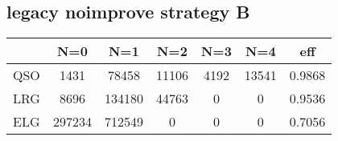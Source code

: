 \documentclass{article}
\begin{document}
\subsection*{legacy noimprove strategy B}
\begin{center}
\begin{tabular}{l|ccccc|c}
 & N=0 & N=1 & N=2 & N=3 & N=4 & eff\\\hline
QSO &  1431 &  78458 &  11106 &  4192 &  13541 &  0.9868\\
LRG &  8696 &  134180 &  44763 &  0 &  0 &  0.9536 \\
ELG &  297234 &  712549 &  0 &  0 &  0 &  0.7056\\
\end{tabular}
\end{center}
\end{document}
